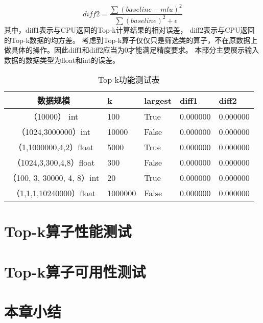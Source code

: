     \begin{equation}
    \label{eq:diff2}
    diff2 = \frac{\sum (baseline - mlu)^2}{\sum (baseline)^2 + \epsilon}
    \end{equation}
其中，diff1表示与CPU返回的Top-k计算结果的相对误差，
diff2表示与CPU返回的Top-k数据的均方差。
考虑到Top-k算子仅仅只是筛选类的算子，不在原数据上做具体的操作。因此diff1和diff2应当为0才能满足精度要求。
本部分主要展示输入数据的数据类型为float和int的误差。
\begin{table}
\centering
\caption{Top-k功能测试表}
\label{tab:presicion}
\begin{tabular}{cllll}
    \toprule
    数据规模         & k  & largest & diff1    & diff2 \\
    \midrule
    （10000） int& 100      & True      & 0.000000 & 0.000000 \\
    （1024,3000000）int & 10000 & False      & 0.000000 & 0.000000 \\
    （1,1000000,4,2）float   & 5000 & True      & 0.000000 & 0.000000 \\
    （1024,3,300,4,8）float & 300 & False      & 0.000000 & 0.000000 \\
    （100, 3, 30000, 4, 8）int & 20 & True      & 0.000000 & 0.000000 \\
    （1,1,1,10240000）float & 1000000 & False      & 0.000000 & 0.000000 \\

\bottomrule
\end{tabular}
\end{table}



\section{Top-k算子性能测试}

\section{Top-k算子可用性测试}

\section{本章小结}
